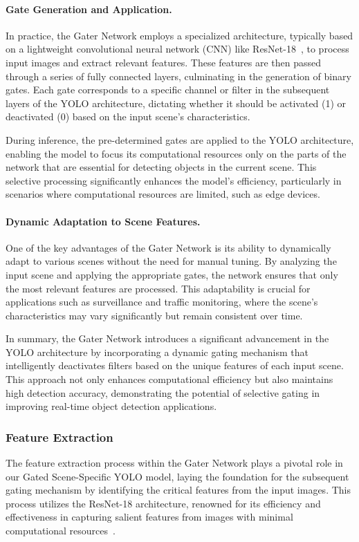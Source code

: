 \paragraph{Gate Generation and Application.} In practice, the Gater Network employs a specialized architecture, typically based on a lightweight convolutional neural network (CNN) like ResNet-18~\cite{he2016deep}, to process input images and extract relevant features. These features are then passed through a series of fully connected layers, culminating in the generation of binary gates. Each gate corresponds to a specific channel or filter in the subsequent layers of the YOLO architecture, dictating whether it should be activated (1) or deactivated (0) based on the input scene's characteristics.

During inference, the pre-determined gates are applied to the YOLO architecture, enabling the model to focus its computational resources only on the parts of the network that are essential for detecting objects in the current scene. This selective processing significantly enhances the model's efficiency, particularly in scenarios where computational resources are limited, such as edge devices.

\paragraph{Dynamic Adaptation to Scene Features.} One of the key advantages of the Gater Network is its ability to dynamically adapt to various scenes without the need for manual tuning. By analyzing the input scene and applying the appropriate gates, the network ensures that only the most relevant features are processed. This adaptability is crucial for applications such as surveillance and traffic monitoring, where the scene's characteristics may vary significantly but remain consistent over time.

In summary, the Gater Network introduces a significant advancement in the YOLO architecture by incorporating a dynamic gating mechanism that intelligently deactivates filters based on the unique features of each input scene. This approach not only enhances computational efficiency but also maintains high detection accuracy, demonstrating the potential of selective gating in improving real-time object detection applications.

\subsubsection{Feature Extraction}
The feature extraction process within the Gater Network plays a pivotal role in our Gated Scene-Specific YOLO model, laying the foundation for the subsequent gating mechanism by identifying the critical features from the input images. This process utilizes the ResNet-18 architecture, renowned for its efficiency and effectiveness in capturing salient features from images with minimal computational resources~\cite{he2016deep}.


